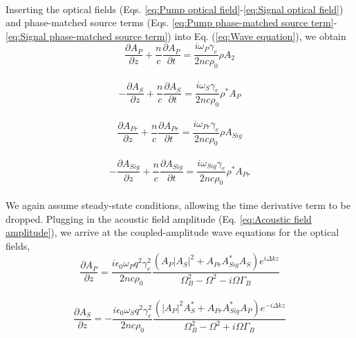 \documentclass[%
  reprint,
  superscriptaddress,
  amsmath,amssymb,
  aps,
  prapplied,
]{revtex4-2}
\begin{document}
\\
Inserting the optical fields (Eqs. \ref{eq:Pump optical field}-\ref{eq:Signal optical field}) and phase-matched source terms (Eqs. \ref{eq:Pump phase-matched source term}-\ref{eq:Signal phase-matched source term}) into Eq. (\ref{eq:Wave equation}), we obtain
\\
\begin{equation}
    \frac{\partial A_{P}}{\partial z} + \frac{n}{c}\frac{\partial A_{P}}{\partial t} = \frac{i\omega_{P}\gamma_{e}}{2nc\rho_{0}}\rho A_{2}
\end{equation}
\\
\begin{equation}
    -\frac{\partial A_{S}}{\partial z} + \frac{n}{c}\frac{\partial A_{S}}{\partial t} = \frac{i\omega_{S}\gamma_{e}}{2nc\rho_{0}}\rho^{*}A_{P}
\end{equation}
\\
\begin{equation}
    \frac{\partial A_{Pr}}{\partial z} + \frac{n}{c}\frac{\partial A_{Pr}}{\partial t} = \frac{i\omega_{Pr}\gamma_{e}}{2nc\rho_{0}}\rho A_{Sig}
\end{equation}
\\
\begin{equation}
    -\frac{\partial A_{Sig}}{\partial z} + \frac{n}{c}\frac{\partial A_{Sig}}{\partial t} = \frac{i\omega_{Sig}\gamma_{e}}{2nc\rho_{0}}\rho^{*}A_{Pr}
\end{equation}
\\
We again assume steady-state conditions, allowing the time derivative term to be dropped. Plugging in the acoustic field amplitude (Eq. \ref{eq:Acoustic field amplitude}), we arrive at the coupled-amplitude wave equations for the optical fields,
\\
\begin{equation}
    \frac{\partial A_{P}}{\partial z} = \frac{i\epsilon_{0}\omega_{P} q^{2}\gamma_{e}^{2}}{2nc\rho_{0}}\frac{(A_{P}|A_{S}|^{2} + A_{Pr}A_{Sig}^{*}A_{S})e^{i\Delta kz}}{\Omega_{B}^{2} - \Omega^{2} - i\Omega\Gamma_{B}}
    \label{eq:Pump coupled-amplitude wave equation}
\end{equation}
\\
\begin{equation}
    \frac{\partial A_{S}}{\partial z} = -\frac{i\epsilon_{0}\omega_{S} q^{2}\gamma_{e}^{2}}{2nc\rho_{0}}\frac{(|A_{P}|^{2}A_{S}^{*} + A_{Pr}A_{Sig}^{*}A_{P})e^{-i\Delta kz}}{\Omega_{B}^{2} - \Omega^{2} + i\Omega\Gamma_{B}}
\end{equation}
\\
\end{document}
